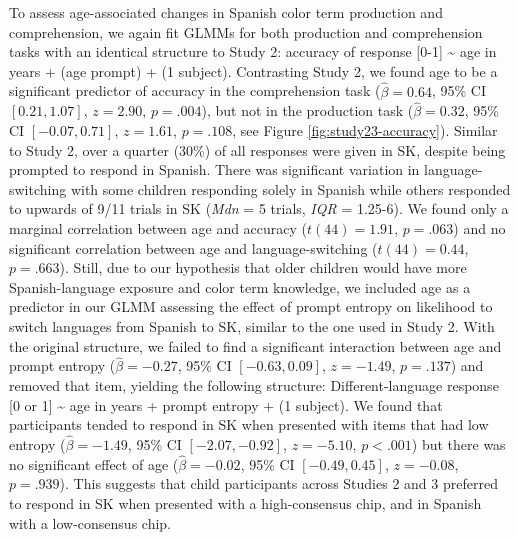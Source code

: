 \documentclass[
  english,
  ,man,floatsintext]{apa6}
\begin{document}
To assess age-associated changes in Spanish color term production and comprehension, we again fit GLMMs for both production and comprehension tasks with an identical structure to Study 2: accuracy of response {[}0-1{]} \textasciitilde{} age in years + (age \textbar{} prompt) + (1 \textbar{} subject). Contrasting Study 2, we found age to be a significant predictor of accuracy in the comprehension task (\(\hat{\beta} = 0.64\), 95\% CI \([0.21, 1.07]\), \(z = 2.90\), \(p = .004\)), but not in the production task (\(\hat{\beta} = 0.32\), 95\% CI \([-0.07, 0.71]\), \(z = 1.61\), \(p = .108\), see Figure \ref{fig:study23-accuracy}). Similar to Study 2, over a quarter (30\%) of all responses were given in SK, despite being prompted to respond in Spanish. There was significant variation in language-switching with some children responding solely in Spanish while others responded to upwards of 9/11 trials in SK (\emph{Mdn} = 5 trials, \emph{IQR} = 1.25-6). We found only a marginal correlation between age and accuracy (\(t(44) = 1.91\), \(p = .063\)) and no significant correlation between age and language-switching (\(t(44) = 0.44\), \(p = .663\)). Still, due to our hypothesis that older children would have more Spanish-language exposure and color term knowledge, we included age as a predictor in our GLMM assessing the effect of prompt entropy on likelihood to switch languages from Spanish to SK, similar to the one used in Study 2. With the original structure, we failed to find a significant interaction between age and prompt entropy (\(\hat{\beta} = -0.27\), 95\% CI \([-0.63, 0.09]\), \(z = -1.49\), \(p = .137\)) and removed that item, yielding the following structure: Different-language response {[}0 or 1{]} \textasciitilde{} age in years + prompt entropy + (1 \textbar{} subject). We found that participants tended to respond in SK when presented with items that had low entropy (\(\hat{\beta} = -1.49\), 95\% CI \([-2.07, -0.92]\), \(z = -5.10\), \(p < .001\)) but there was no significant effect of age (\(\hat{\beta} = -0.02\), 95\% CI \([-0.49, 0.45]\), \(z = -0.08\), \(p = .939\)). This suggests that child participants across Studies 2 and 3 preferred to respond in SK when presented with a high-consensus chip, and in Spanish with a low-consensus chip.
\end{document}
